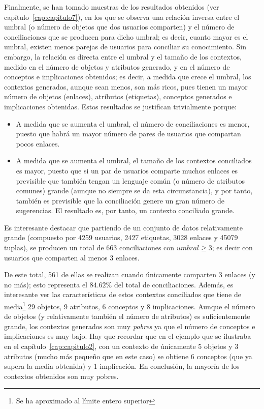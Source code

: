 Finalmente, se han tomado muestras de los resultados obtenidos (ver capítulo~\ref{cap:capitulo7}), en los que se observa una relación inversa entre el umbral (o número de objetos que dos usuarios comparten) y el número de conciliaciones que se producen para dicho umbral; es decir, cuanto mayor es el umbral, existen menos parejas de usuarios para conciliar su conocimiento. Sin embargo, la relación es directa entre el umbral y el tamaño de los contextos, medido en el número de objetos y atributos generado, y en el número de conceptos e implicaciones obtenidos; es decir, a medida que crece el umbral, los contextos generados, aunque sean menos, son más ricos, pues tienen un mayor número de objetos (enlaces), atributos (etiquetas), conceptos generados e implicaciones obtenidas. Estos resultados se justifican trivialmente porque:
\begin{itemize}
	\item A medida que se aumenta el umbral, el número de conciliaciones es menor, puesto que habrá un mayor número de pares de usuarios que compartan pocos enlaces.
	\item A medida que se aumenta el umbral, el tamaño de los contextos conciliados es mayor, puesto que si un par de usuarios comparte muchos enlaces es previsible que también tengan un lenguaje común (o número de atributos comunes) grande (aunque no siempre se da esta circunstancia), y por tanto, también es previsible que la conciliación genere un gran número de sugerencias. El resultado es, por tanto, un contexto conciliado grande.
\end{itemize}

Es interesante destacar que partiendo de un conjunto de datos relativamente grande (compuesto por 4259 usuarios, 2427 etiquetas, 3028 enlaces y 45079 tuplas), se producen un total de 663 conciliaciones con $umbral \geq 3$; es decir con usuarios que comparten al menos 3 enlaces.

De este total, 561 de ellas se realizan cuando únicamente comparten 3 enlaces (y no más); esto representa el $84.62$\% del total de conciliaciones. Además, es interesante ver las características de estos contextos conciliados que tiene de media\footnote{Se ha aproximado al límite entero superior} 29 objetos, 9 atributos, 6 conceptos y 8 implicaciones. Aunque el número de objetos (y relativamente también el número de atributos) es suficientemente grande, los contextos generados son muy \emph{pobres} ya que el número de conceptos e implicaciones es muy bajo. Hay que recordar que en el ejemplo que se ilustraba en el capítulo~\ref{cap:capitulo2}, con un contexto de únicamente 5 objetos y 3 atributos (mucho más pequeño que en este caso) se obtiene 6 conceptos (que ya supera la media obtenida) y 1 implicación. En conclusión, la mayoría de los contextos obtenidos son muy pobres.

